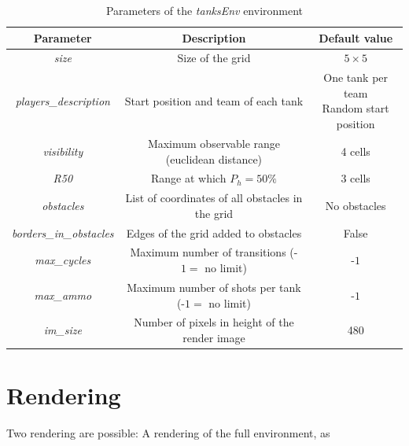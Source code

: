 \begin{table}[h!]
    \centering
    \begin{tabular}{|c|c|c|}
        \hline
        Parameter &  Description &  Default value \\\hline 
        \textit{size} & Size of the grid & $5\times5$ \\\hline 
        \textit{players\_description} & Start position and team of each tank & \makecell{One tank per team\\ Random start position}\\\hline
        \textit{visibility} & Maximum observable range (euclidean distance) & 4 cells \\\hline
        \textit{R50} & Range at which $P_{h}=50\%$ & 3 cells\\\hline
        \textit{obstacles} & List of coordinates of all obstacles in the grid & No obstacles\\\hline
        \textit{borders\_in\_obstacles} & Edges of the grid added to obstacles & False\\\hline
        \textit{max\_cycles} & Maximum number of transitions (-$1=$ no limit) & -$1$ \\\hline
        \textit{max\_ammo} & Maximum number of shots per tank  (-$1=$ no limit) & -$1$ \\\hline
        \textit{im\_size} & Number of pixels in height of the render image & 480\\\hline 
    \end{tabular}
    \caption{Parameters of the \textit{tanksEnv} environment}
    \label{tab:env params} 
\end{table}


\section{Rendering}

Two rendering are possible: A rendering of the full environment, as 

